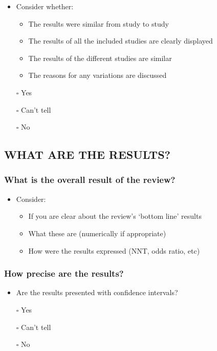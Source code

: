 \documentclass[
  doc, a4paper]{apa7}
\providecommand{\tightlist}{%
  \setlength{\itemsep}{0pt}\setlength{\parskip}{0pt}}
\begin{document}
\begin{itemize}
\tightlist
\item
  Consider whether:

  \begin{itemize}
  \tightlist
  \item
    The results were similar from study to study
  \item
    The results of all the included studies are clearly displayed
  \item
    The results of the different studies are similar
  \item
    The reasons for any variations are discussed
  \end{itemize}
\item[$\square$]
  Yes
\item[$\square$]
  Can't tell
\item[$\square$]
  No
\end{itemize}

\subsection{WHAT ARE THE RESULTS?}\label{what-are-the-results}

\subsubsection{What is the overall result of the review?}\label{what-is-the-overall-result-of-the-review}

\begin{itemize}
\tightlist
\item
  Consider:

  \begin{itemize}
  \tightlist
  \item
    If you are clear about the review's `bottom line' results
  \item
    What these are (numerically if appropriate)
  \item
    How were the results expressed (NNT, odds ratio, etc)
  \end{itemize}
\end{itemize}

\subsubsection{How precise are the results?}\label{how-precise-are-the-results}

\begin{itemize}
\tightlist
\item
  Are the results presented with confidence intervals?
\item[$\square$]
  Yes
\item[$\square$]
  Can't tell
\item[$\square$]
  No
\end{itemize}
\end{document}
